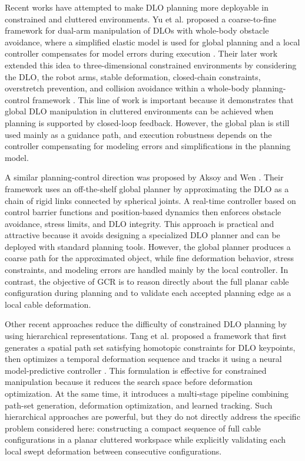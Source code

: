 \documentclass{pas}
\begin{document}
Recent works have attempted to make DLO planning more deployable in
constrained and cluttered environments. Yu et al. proposed a coarse-to-fine framework for dual-arm manipulation of DLOs with whole-body obstacle avoidance, where a simplified elastic model is used for global planning and a local controller compensates for model errors during execution \cite{yu2023coarse}. Their later work extended this idea to three-dimensional constrained environments by considering the DLO, the robot arms, stable deformation, closed-chain constraints, overstretch prevention, and collision avoidance within a whole-body planning-control framework \cite{yu2025generalizable}. This line of work is important because it demonstrates that global DLO manipulation in cluttered environments can be achieved when planning is supported by closed-loop feedback. However, the global plan is still used mainly as a guidance path, and execution robustness depends on the controller compensating for modeling errors and simplifications in the planning
model.

A similar planning-control direction was proposed by Aksoy and Wen
\cite{AksoyWen2025DLOPlanningControl}. Their framework uses an off-the-shelf
global planner by approximating the DLO as a chain of rigid links connected by
spherical joints. A real-time controller based on control barrier functions and
position-based dynamics then enforces obstacle avoidance, stress limits, and DLO
integrity. This approach is practical and attractive because it avoids designing a
specialized DLO planner and can be deployed with standard planning tools.
However, the global planner produces a coarse path for the approximated object,
while fine deformation behavior, stress constraints, and modeling errors are
handled mainly by the local controller. In contrast, the objective of GCR is to
reason directly about the full planar cable configuration during planning and to
validate each accepted planning edge as a local cable deformation.

Other recent approaches reduce the difficulty of constrained DLO planning by
using hierarchical representations. Tang et al. proposed a framework that first
generates a spatial path set satisfying homotopic constraints for DLO keypoints,
then optimizes a temporal deformation sequence and tracks it using a neural
model-predictive controller \cite{tang2026hierarchical}. This formulation is effective for
constrained manipulation because it reduces the search space before deformation
optimization. At the same time, it introduces a multi-stage pipeline combining
path-set generation, deformation optimization, and learned tracking. Such
hierarchical approaches are powerful, but they do not directly address the
specific problem considered here: constructing a compact sequence of full cable
configurations in a planar cluttered workspace while explicitly validating each
local swept deformation between consecutive configurations.
\end{document}
